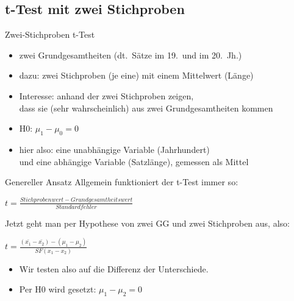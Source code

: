 \subsection{t-Test mit zwei Stichproben}

\begin{frame}
  {Zwei-Stichproben t-Test}
  \begin{itemize}[<+->]
    \item \alert{zwei Grundgesamtheiten} (\zB dt.\ Sätze im 19.\ und im 20.\ Jh.)
    \item dazu: \alert{zwei Stichproben} (je eine) mit einem \alert{Mittelwert} (\zB Länge)
    \item Interesse: anhand der \alert{zwei Stichproben} zeigen,\\
      dass sie (sehr wahrscheinlich) \alert{aus zwei Grundgesamtheiten} kommen
    \item \alert{H0: $\mu_1-\mu_0=0$}
    \item hier also: eine unabhängige Variable (Jahrhundert)\\
      und eine abhängige Variable (Satzlänge), gemessen als Mittel
  \end{itemize}
\end{frame}

\begin{frame}
  {Genereller Ansatz}
  Allgemein funktioniert der t-Test \alert{immer} so:
  \begin{center}
    \alert{$t=\frac{Stichprobenwert-Grundgesamtheitswert}{Standardfehler}$}
  \end{center}
  \pause
  Jetzt geht man per Hypothese von zwei GG und zwei Stichproben aus, also:
  \pause
  \begin{center}
    \alert{$t=\frac{(\bar{x_1}-\bar{x_2})-(\mu_1-\mu_2)}{SF(x_1-x_2)}$}
  \end{center}
  \pause
  \begin{itemize}[<+->]
    \item Wir testen also auf die \alert{Differenz der Unterschiede}.
    \item Per H0 wird gesetzt: \alert{$\mu_1-\mu_2=0$}
  \end{itemize} 
\end{frame}

